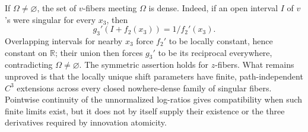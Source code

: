 If \(\Omega\neq\varnothing\), the set of \(v\)-fibers meeting \(\Omega\) is dense.  Indeed, if an open interval \(I\) of \(v\)'s were singular for every \(x_3\), then
\[
 g_3'(I+f_2(x_3))=1/f_2'(x_3).
\]
Overlapping intervals for nearby \(x_3\) force \(f_2'\) to be locally constant, hence constant on \(\mathbb R\); their union then forces \(g_3'\) to be its reciprocal everywhere, contradicting \(\Omega\neq\varnothing\).  The symmetric assertion holds for \(z\)-fibers.  What remains unproved is that the locally unique shift parameters have finite, path-independent \(C^3\) extensions across every closed nowhere-dense family of singular fibers.  Pointwise continuity of the unnormalized log-ratios gives compatibility when such finite limits exist, but it does not by itself supply their existence or the three derivatives required by innovation atomicity.